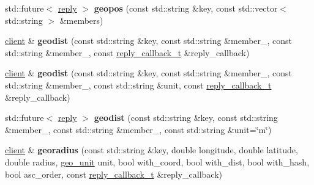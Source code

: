 \begin{DoxyCompactItemize}
\item 
\mbox{\label{classcpp__redis_1_1client_a8166870c7f3b6c5152eb85a233d78368}} 
std\+::future$<$ \mbox{\hyperlink{classcpp__redis_1_1reply}{reply}} $>$ {\bfseries geopos} (const std\+::string \&key, const std\+::vector$<$ std\+::string $>$ \&members)
\item 
\mbox{\label{classcpp__redis_1_1client_a56df27bbe73c7738854150359ba39958}} 
\mbox{\hyperlink{classcpp__redis_1_1client}{client}} \& {\bfseries geodist} (const std\+::string \&key, const std\+::string \&member\+\_, const std\+::string \&member\+\_, const \mbox{\hyperlink{classcpp__redis_1_1client_af7a65eb21aa25230bfbb0b0203c4fc04}{reply\+\_\+callback\+\_\+t}} \&reply\+\_\+callback)
\item 
\mbox{\label{classcpp__redis_1_1client_ade755123f2de81995df6a66a363a0dfb}} 
\mbox{\hyperlink{classcpp__redis_1_1client}{client}} \& {\bfseries geodist} (const std\+::string \&key, const std\+::string \&member\+\_, const std\+::string \&member\+\_, const std\+::string \&unit, const \mbox{\hyperlink{classcpp__redis_1_1client_af7a65eb21aa25230bfbb0b0203c4fc04}{reply\+\_\+callback\+\_\+t}} \&reply\+\_\+callback)
\item 
\mbox{\label{classcpp__redis_1_1client_a32c21dc5c2b8187c33e22e695c2f1555}} 
std\+::future$<$ \mbox{\hyperlink{classcpp__redis_1_1reply}{reply}} $>$ {\bfseries geodist} (const std\+::string \&key, const std\+::string \&member\+\_, const std\+::string \&member\+\_, const std\+::string \&unit=\char`\"{}m\char`\"{})
\item 
\mbox{\label{classcpp__redis_1_1client_a34a5bcb40fc9d094f540ca85adc9b6c2}} 
\mbox{\hyperlink{classcpp__redis_1_1client}{client}} \& {\bfseries georadius} (const std\+::string \&key, double longitude, double latitude, double radius, \mbox{\hyperlink{classcpp__redis_1_1client_aa5998536fd32ff4387c89be514997620}{geo\+\_\+unit}} unit, bool with\+\_\+coord, bool with\+\_\+dist, bool with\+\_\+hash, bool asc\+\_\+order, const \mbox{\hyperlink{classcpp__redis_1_1client_af7a65eb21aa25230bfbb0b0203c4fc04}{reply\+\_\+callback\+\_\+t}} \&reply\+\_\+callback)
\item 
\mbox{\label{classcpp__redis_1_1client_a4e2dc000f6f89c08119500b4764f3db6}} 

\end{DoxyCompactItemize}
